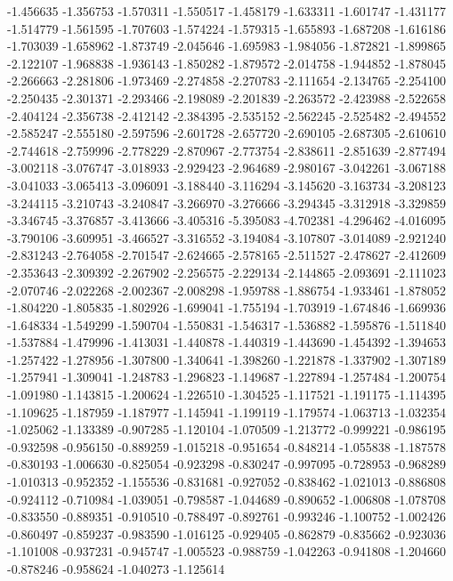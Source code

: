-1.456635
-1.356753
-1.570311
-1.550517
-1.458179
-1.633311
-1.601747
-1.431177
-1.514779
-1.561595
-1.707603
-1.574224
-1.579315
-1.655893
-1.687208
-1.616186
-1.703039
-1.658962
-1.873749
-2.045646
-1.695983
-1.984056
-1.872821
-1.899865
-2.122107
-1.968838
-1.936143
-1.850282
-1.879572
-2.014758
-1.944852
-1.878045
-2.266663
-2.281806
-1.973469
-2.274858
-2.270783
-2.111654
-2.134765
-2.254100
-2.250435
-2.301371
-2.293466
-2.198089
-2.201839
-2.263572
-2.423988
-2.522658
-2.404124
-2.356738
-2.412142
-2.384395
-2.535152
-2.562245
-2.525482
-2.494552
-2.585247
-2.555180
-2.597596
-2.601728
-2.657720
-2.690105
-2.687305
-2.610610
-2.744618
-2.759996
-2.778229
-2.870967
-2.773754
-2.838611
-2.851639
-2.877494
-3.002118
-3.076747
-3.018933
-2.929423
-2.964689
-2.980167
-3.042261
-3.067188
-3.041033
-3.065413
-3.096091
-3.188440
-3.116294
-3.145620
-3.163734
-3.208123
-3.244115
-3.210743
-3.240847
-3.266970
-3.276666
-3.294345
-3.312918
-3.329859
-3.346745
-3.376857
-3.413666
-3.405316
-5.395083
-4.702381
-4.296462
-4.016095
-3.790106
-3.609951
-3.466527
-3.316552
-3.194084
-3.107807
-3.014089
-2.921240
-2.831243
-2.764058
-2.701547
-2.624665
-2.578165
-2.511527
-2.478627
-2.412609
-2.353643
-2.309392
-2.267902
-2.256575
-2.229134
-2.144865
-2.093691
-2.111023
-2.070746
-2.022268
-2.002367
-2.008298
-1.959788
-1.886754
-1.933461
-1.878052
-1.804220
-1.805835
-1.802926
-1.699041
-1.755194
-1.703919
-1.674846
-1.669936
-1.648334
-1.549299
-1.590704
-1.550831
-1.546317
-1.536882
-1.595876
-1.511840
-1.537884
-1.479996
-1.413031
-1.440878
-1.440319
-1.443690
-1.454392
-1.394653
-1.257422
-1.278956
-1.307800
-1.340641
-1.398260
-1.221878
-1.337902
-1.307189
-1.257941
-1.309041
-1.248783
-1.296823
-1.149687
-1.227894
-1.257484
-1.200754
-1.091980
-1.143815
-1.200624
-1.226510
-1.304525
-1.117521
-1.191175
-1.114395
-1.109625
-1.187959
-1.187977
-1.145941
-1.199119
-1.179574
-1.063713
-1.032354
-1.025062
-1.133389
-0.907285
-1.120104
-1.070509
-1.213772
-0.999221
-0.986195
-0.932598
-0.956150
-0.889259
-1.015218
-0.951654
-0.848214
-1.055838
-1.187578
-0.830193
-1.006630
-0.825054
-0.923298
-0.830247
-0.997095
-0.728953
-0.968289
-1.010313
-0.952352
-1.155536
-0.831681
-0.927052
-0.838462
-1.021013
-0.886808
-0.924112
-0.710984
-1.039051
-0.798587
-1.044689
-0.890652
-1.006808
-1.078708
-0.833550
-0.889351
-0.910510
-0.788497
-0.892761
-0.993246
-1.100752
-1.002426
-0.860497
-0.859237
-0.983590
-1.016125
-0.929405
-0.862879
-0.835662
-0.923036
-1.101008
-0.937231
-0.945747
-1.005523
-0.988759
-1.042263
-0.941808
-1.204660
-0.878246
-0.958624
-1.040273
-1.125614

